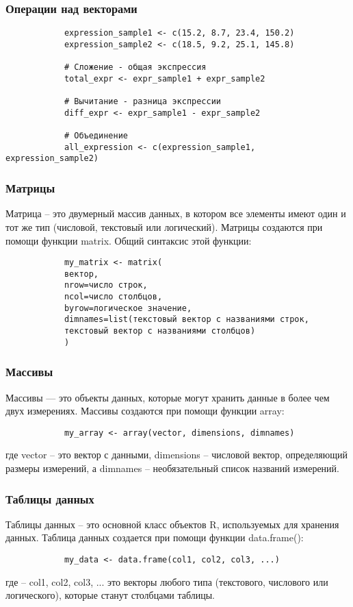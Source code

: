 \documentclass[10pt]{beamer}
\begin{document}
	\begin{frame}[fragile]
		\frametitle{Операции над векторами}
		\begin{verbatim}
			expression_sample1 <- c(15.2, 8.7, 23.4, 150.2)
			expression_sample2 <- c(18.5, 9.2, 25.1, 145.8)
			
			# Сложение - общая экспрессия
			total_expr <- expr_sample1 + expr_sample2
			
			# Вычитание - разница экспрессии
			diff_expr <- expr_sample1 - expr_sample2
			
			# Объединение
			all_expression <- c(expression_sample1, expression_sample2)
		\end{verbatim}
	\end{frame}
	
	\begin{frame}[fragile]
		\frametitle{Матрицы}
		Матрица – это двумерный массив данных, в котором все элементы имеют один и тот же тип (числовой, текстовый или логический). Матрицы создаются при помощи функции matrix. Общий синтаксис этой функции:
		\begin{verbatim}
			my_matrix <- matrix(
			вектор, 
			nrow=число строк, 
			ncol=число столбцов, 
			byrow=логическое значение, 
			dimnames=list(текстовый вектор с названиями строк, 
			текстовый вектор с названиями столбцов)
			)
		\end{verbatim}
		
		
	\end{frame}
	
	\begin{frame}[fragile]
		
		
		\frametitle{Массивы}
		Массивы — это объекты данных, которые могут хранить данные в более чем двух измерениях. Массивы создаются при помощи функции array:
		
		\begin{verbatim}
			my_array <- array(vector, dimensions, dimnames)
		\end{verbatim}
		где vector – это вектор с данными, dimensions – числовой вектор, определяющий размеры измерений, а dimnames – необязательный список названий измерений.	
	\end{frame}
	
	\begin{frame}[fragile]
		\frametitle{Таблицы данных}
		Таблицы данных – это основной класс объектов R, используемых для хранения данных.  Таблица данных создается при помощи функции data.frame():
		\begin{verbatim}
			my_data <- data.frame(col1, col2, col3, ...)
		\end{verbatim}
		где – col1, col2, col3, ... это векторы любого типа (текстового, числового или логического), которые станут столбцами таблицы.	
	\end{frame}
	
\end{document}
